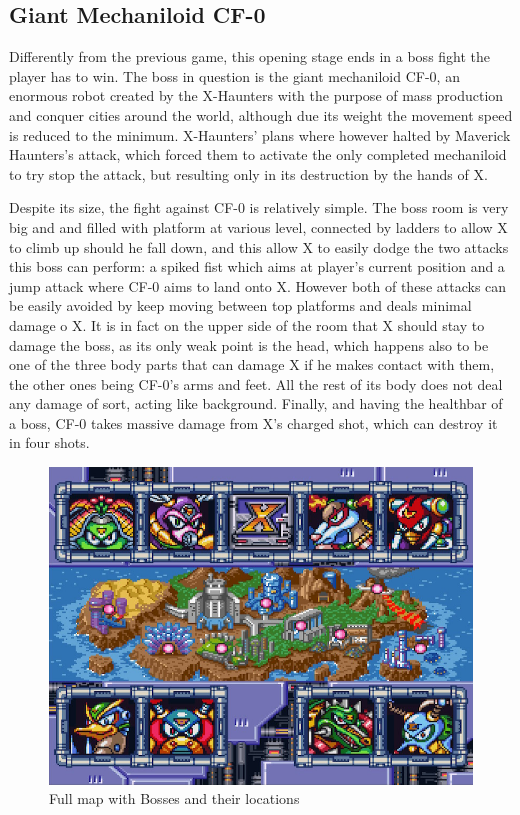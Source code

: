 \subsection{Giant Mechaniloid CF-0}
Differently from the previous game, this opening stage ends in a boss fight the player has to win. The boss in question is the giant mechaniloid CF-0, an enormous robot created by the X-Haunters with the purpose of mass production and conquer cities around the world, although due its weight the movement speed is reduced to the minimum. X-Haunters' plans where however halted by Maverick Haunters's attack, which forced them to activate the only completed mechaniloid to try stop the attack, but resulting only in its destruction by the hands of X.

Despite its size, the fight against CF-0 is relatively simple. The boss room is very big and and filled with platform at various level, connected by ladders to allow X to climb up should he fall down, and this allow X to easily dodge the two attacks this boss can perform: a spiked fist which aims at player's current position and a jump attack where CF-0 aims to land onto X. However both of these attacks can be easily avoided by keep moving between top platforms and deals minimal damage o X. It is in fact on the upper side of the room that X should stay to damage the boss, as its only weak point is the head, which happens also to be one of the three body parts that can damage X if he makes contact with them, the other ones being CF-0's arms and feet. All the rest of its body does not deal any damage of sort, acting like background. Finally, and having the healthbar of a boss, CF-0 takes massive damage from X's charged shot, which can destroy it in four shots.


\begin{figure}[htp]
	\centering
	\includegraphics[width=0.5\linewidth]{figures/X2/map.png}
	\caption{Full map with Bosses and their locations}
\end{figure}


